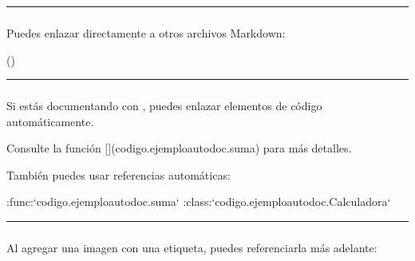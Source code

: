 \documentclass[a4paper,10pt,oneside,spanish,openany]{sphinxmanual}
\begin{document}
\bigskip\hrule\bigskip



\subsubsection{}
\label{\detokenize{configuracion_inicial/013.guia_de_myst_parser:referencias-cruzadas-a-archivos}}
\sphinxAtStartPar
Puedes enlazar directamente a otros archivos Markdown:

\begin{sphinxVerbatim}()
\end{sphinxVerbatim}


\bigskip\hrule\bigskip



\subsubsection{}
\label{\detokenize{configuracion_inicial/013.guia_de_myst_parser:referencias-a-funciones-clases-y-metodos-autodoc}}
\sphinxAtStartPar
Si estás documentando con , puedes enlazar elementos de código automáticamente.

\begin{sphinxVerbatim}[commandchars=\\\{\}]
Consulte la función [](codigo.ejemplo\PYGZus{}autodoc.suma) para más detalles.
\end{sphinxVerbatim}

\sphinxAtStartPar
También puedes usar referencias automáticas:

\begin{sphinxVerbatim}[commandchars=\\\{\}]
:func:`codigo.ejemplo\PYGZus{}autodoc.suma`
:class:`codigo.ejemplo\PYGZus{}autodoc.Calculadora`
\end{sphinxVerbatim}


\bigskip\hrule\bigskip



\subsubsection{}
\label{\detokenize{configuracion_inicial/013.guia_de_myst_parser:referencias-a-figuras-e-imagenes}}
\sphinxAtStartPar
Al agregar una imagen con una etiqueta, puedes referenciarla más adelante:
\end{document}
